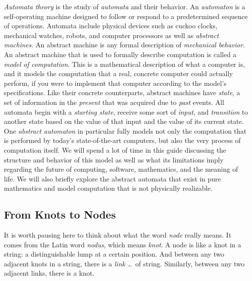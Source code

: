 \textit{Automata theory} is the study of \textit{automata} and their behavior. An \textit{automaton} is a self-operating machine designed to follow or respond to a predetermined sequence of operations. Automata include physical devices such as cuckoo clocks, mechanical watches, robots, and computer processors as well as \textit{abstract machines}. An abstract machine is any formal description of \textit{mechanical behavior}. An abstract machine that is used to formally describe computation is called a \textit{model of computation}. This is a mathematical description of what a computer is, and it models the computation that a real, concrete computer could actually perform, if you were to implement that computer according to the model's specifications. Like their concrete counterparts, abstract machines have \textit{state}, a set of information in the \textit{present} that was acquired due to \textit{past} events. All automata begin with a \textit{starting state}, receive some sort of \textit{input}, and \textit{transition} to another state based on the value of that input and the value of its current state. \\

One \textit{abstract automaton} in particular fully models not only the computation that is performed by today's state-of-the-art computers, but also the very process of computation itself. We will spend a lot of time in this guide discussing the structure and behavior of this model as well as what its limitations imply regarding the future of computing, software, mathematics, and the meaning of life. We will also briefly explore the abstract automata that exist in pure mathematics and model computation that is not physically realizable. \\


\subsection{From Knots to Nodes}


It is worth pausing here to think about what the word \textit{node} really means. It comes from the Latin word \textit{nodus}, which means \textit{knot}. A node is like a knot in a string: a distinguishable lump at a certain position. And between any two adjacent knots in a string, there is a \textit{link} \dots\ of string. Similarly, between any two adjacent links, there is a knot. \\

